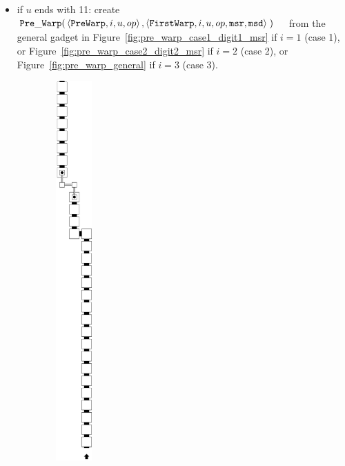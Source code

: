 \begin{itemize}
\begin{itemize}
            \item if $u$ ends with 11:
            create
            $\begin{aligned}[t]
                {\tt Pre\_Warp}(& \left\langle {\tt PreWarp},   i, u, op \right\rangle,
                           \left\langle {\tt FirstWarp}, i, u, op, {\tt msr}, {\tt msd} \right\rangle \;)
            \end{aligned}$ from the general gadget in Figure~\ref{fig:pre_warp_case1_digit1_msr} if $i = 1$ (case 1),
            or Figure~\ref{fig:pre_warp_case2_digit2_msr} if $i = 2$ (case 2), or Figure~\ref{fig:pre_warp_general} if $i = 3$ (case 3).
        \end{itemize}
        \vspace{.5cm}

        \begin{figure}[H]
            \centering
            \begin{subfigure}[t]{0.24\textwidth}
                \centering
                \includegraphics[width=0.15\textwidth]{warping/pre_warp_general}

\end{subfigure}
\end{figure}
\end{itemize}
